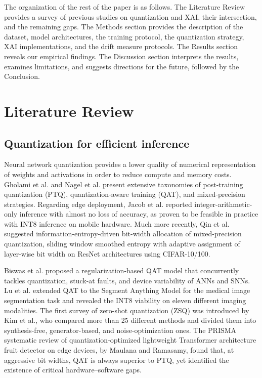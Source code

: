 \documentclass[fleqn,10pt]{wlscirep}
\begin{document}
\noindent The organization of the rest of the paper is as follows. The Literature Review provides a survey of previous studies on quantization and XAI, their intersection, and the remaining gaps. The Methods section provides the description of the dataset, model architectures, the training protocol, the quantization strategy, XAI implementations, and the drift measure protocols. The Results section reveals our empirical findings. The Discussion section interprets the results, examines limitations, and suggests directions for the future, followed by the Conclusion.


\section*{Literature Review}

\subsection*{Quantization for efficient inference}

Neural network quantization provides a lower quality of numerical representation of weights and activations in order to reduce compute and memory costs. Gholami et al.\cite{Gholami2021survey} and Nagel et al.\cite{Nagel2021whitepaper} present extensive taxonomies of post-training quantization (PTQ), quantization-aware training (QAT), and mixed-precision strategies. Regarding edge deployment, Jacob et al.\cite{Jacob2018quantization} reported integer-arithmetic-only inference with almost no loss of accuracy, as proven to be feasible in practice with INT8 inference on mobile hardware. Much more recently, Qin et al.\cite{Qin2025entropy} suggested information-entropy-driven bit-width allocation of mixed-precision quantization, sliding window smoothed entropy with adaptive assignment of layer-wise bit width on ResNet architectures using CIFAR-10/100.

Biswas et al.\cite{Biswas2025regularization} proposed a regularization-based QAT model that concurrently tackles quantization, stuck-at faults, and device variability of ANNs and SNNs. Lu et al.\cite{Lu2024qatsam} extended QAT to the Segment Anything Model for the medical image segmentation task and revealed the INT8 viability on eleven different imaging modalities. The first survey of zero-shot quantization (ZSQ) was introduced by Kim et al.\cite{Kim2025zsqsurvey}, who compared more than 25 different methods and divided them into synthesis-free, generator-based, and noise-optimization ones. The PRISMA systematic review of quantization-optimized lightweight Transformer architecture fruit detector on edge devices, by Maulana and Ramasamy\cite{Maulana2026review}, found that, at aggressive bit widths, QAT is always superior to PTQ, yet identified the existence of critical hardware--software gaps.
\end{document}
